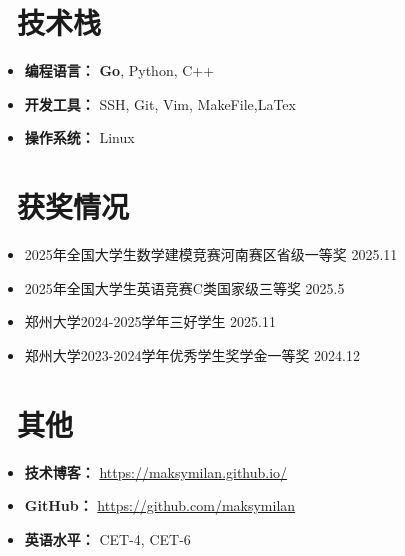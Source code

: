 \documentclass[11pt]{article}
\begin{document}
\section{\makebox[\widthof{\faCogs}][c]{\color{CVBlue}\faCogs}\ 技术栈}
\begin{itemize}[nosep]
    \item \textbf{编程语言：} \textbf{Go}, Python, C++
    \item \textbf{开发工具：} SSH, Git, Vim, MakeFile,LaTex
    \item \textbf{操作系统：} Linux
\end{itemize}
\section{\makebox[\widthof{\faGraduationCap}][c]{\color{CVBlue}\faList}\ 获奖情况}
\begin{itemize}
    \item 2025年全国大学生数学建模竞赛河南赛区省级一等奖 \hfill 2025.11
    \item 2025年全国大学生英语竞赛C类国家级三等奖 \hfill 2025.5
    \item 郑州大学2024-2025学年三好学生 \hfill 2025.11
    \item 郑州大学2023-2024学年优秀学生奖学金一等奖 \hfill 2024.12
\end{itemize}
    
\section{\makebox[\widthof{\faInfo}][c]{\color{CVBlue}\faInfo}\ 其他}
\begin{itemize}[parsep=0.5ex]
    \item \textbf{技术博客：} \href{https://maksymilan.github.io/}{https://maksymilan.github.io/}
    \item \textbf{GitHub：} \href{https://github.com/maksymilan}{https://github.com/maksymilan} 
    \item \textbf{英语水平：} CET-4, CET-6
\end{itemize}
\end{document}
